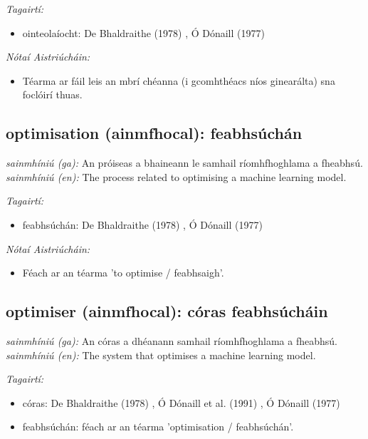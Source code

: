 \documentclass{article}
\begin{document}
 \noindent \textit{Tagairtí:}
\begin{itemize}
	\item ointeolaíocht: De Bhaldraithe (1978) \cite{de-bhaldraithe}, Ó Dónaill (1977) \cite{odonaill}
\end{itemize}

 \noindent \textit{Nótaí Aistriúcháin:}
\begin{itemize}
	\item Téarma ar fáil leis an mbrí chéanna (i gcomhthéacs níos ginearálta) sna foclóirí thuas.
\end{itemize}


\subsection*{optimisation (ainmfhocal): feabhsúchán} 
 \noindent \textit{sainmhíniú (ga):} An próiseas a bhaineann le samhail ríomhfhoghlama a fheabhsú.
\newline\newline
 \noindent \textit{sainmhíniú (en):} The process related to optimising a machine learning model.
\newline

 \noindent \textit{Tagairtí:}
\begin{itemize}
	\item feabhsúchán: De Bhaldraithe (1978) \cite{de-bhaldraithe}, Ó Dónaill (1977) \cite{odonaill}
\end{itemize}

 \noindent \textit{Nótaí Aistriúcháin:}
\begin{itemize}
	\item Féach ar an téarma 'to optimise / feabhsaigh'.
\end{itemize}


\subsection*{optimiser (ainmfhocal): córas feabhsúcháin} 
 \noindent \textit{sainmhíniú (ga):} An córas a dhéanann samhail ríomhfhoghlama a fheabhsú.
\newline\newline
 \noindent \textit{sainmhíniú (en):} The system that optimises a machine learning model.
\newline

 \noindent \textit{Tagairtí:}
\begin{itemize}
	\item córas: De Bhaldraithe (1978) \cite{de-bhaldraithe}, Ó Dónaill et al. (1991) \cite{focloir-beag}, Ó Dónaill (1977) \cite{odonaill}
	\item feabhsúchán: féach ar an téarma 'optimisation / feabhsúchán'.
\end{itemize}
\end{document}
